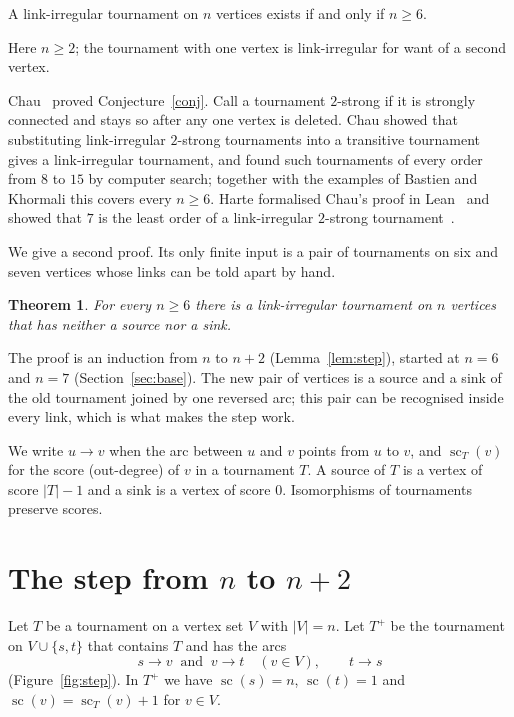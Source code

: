 \documentclass[11pt]{amsart}
\newtheorem{theorem}{Theorem}[section]
\theoremstyle{definition}
\newenvironment{conjecture}[1]{\renewcommand{\theinnerconj}{#1}\innerconj}{\endinnerconj}
\theoremstyle{remark}
\numberwithin{equation}{section}
\newcommand{\sco}{\operatorname{sc}}
\begin{document}
\begin{conjecture}{1}\label{conj}
A link-irregular tournament on $n$ vertices exists if and only if $n\ge6$.
\end{conjecture}

Here $n\ge2$; the tournament with one vertex is link-irregular for want of a second vertex.

Chau~\cite{Chau} proved Conjecture~\ref{conj}. Call a tournament $2$-strong if it is strongly connected and stays so after any one vertex is deleted. Chau showed that substituting link-irregular $2$-strong tournaments into a transitive tournament gives a link-irregular tournament, and found such tournaments of every order from $8$ to $15$ by computer search; together with the examples of Bastien and Khormali this covers every $n\ge6$. Harte formalised Chau's proof in Lean~\cite{HarteLean} and showed that $7$ is the least order of a link-irregular $2$-strong tournament~\cite{Harte}.

We give a second proof. Its only finite input is a pair of tournaments on six and seven vertices whose links can be told apart by hand.

\begin{theorem}\label{thm:main}
For every $n\ge6$ there is a link-irregular tournament on $n$ vertices that has neither a source nor a sink.
\end{theorem}

The proof is an induction from $n$ to $n+2$ (Lemma~\ref{lem:step}), started at $n=6$ and $n=7$ (Section~\ref{sec:base}). The new pair of vertices is a source and a sink of the old tournament joined by one reversed arc; this pair can be recognised inside every link, which is what makes the step work.

We write $u\to v$ when the arc between $u$ and $v$ points from $u$ to $v$, and $\sco_T(v)$ for the score (out-degree) of $v$ in a tournament $T$. A source of $T$ is a vertex of score $|T|-1$ and a sink is a vertex of score $0$. Isomorphisms of tournaments preserve scores.

\section{The step from $n$ to $n+2$}

Let $T$ be a tournament on a vertex set $V$ with $|V|=n$. Let $T^+$ be the tournament on $V\cup\{s,t\}$ that contains $T$ and has the arcs
\[
s\to v\ \text{ and }\ v\to t\quad (v\in V),\qquad t\to s
\]
(Figure~\ref{fig:step}). In $T^+$ we have $\sco(s)=n$, $\sco(t)=1$ and $\sco(v)=\sco_T(v)+1$ for $v\in V$.
\end{document}
